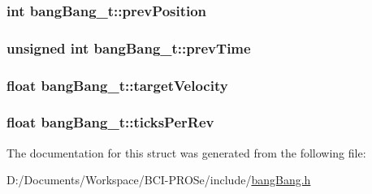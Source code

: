\subsubsection[{\texorpdfstring{prev\+Position}{prevPosition}}]{\setlength{\rightskip}{0pt plus 5cm}int bang\+Bang\+\_\+t\+::prev\+Position}\hypertarget{structbang_bang__t_a08cad64e2f790f4758c6f4318449176c}{}\label{structbang_bang__t_a08cad64e2f790f4758c6f4318449176c}
\subsubsection[{\texorpdfstring{prev\+Time}{prevTime}}]{\setlength{\rightskip}{0pt plus 5cm}unsigned int bang\+Bang\+\_\+t\+::prev\+Time}\hypertarget{structbang_bang__t_a9cb7011acdcf5b3c005effc1084d807c}{}\label{structbang_bang__t_a9cb7011acdcf5b3c005effc1084d807c}
\subsubsection[{\texorpdfstring{target\+Velocity}{targetVelocity}}]{\setlength{\rightskip}{0pt plus 5cm}float bang\+Bang\+\_\+t\+::target\+Velocity}\hypertarget{structbang_bang__t_a45c6612d984871c8051fe831a2a555d9}{}\label{structbang_bang__t_a45c6612d984871c8051fe831a2a555d9}
\subsubsection[{\texorpdfstring{ticks\+Per\+Rev}{ticksPerRev}}]{\setlength{\rightskip}{0pt plus 5cm}float bang\+Bang\+\_\+t\+::ticks\+Per\+Rev}\hypertarget{structbang_bang__t_aae2001616d202114e9557ea4b07158d9}{}\label{structbang_bang__t_aae2001616d202114e9557ea4b07158d9}


The documentation for this struct was generated from the following file\+:\begin{DoxyCompactItemize}
\item 
D\+:/\+Documents/\+Workspace/\+B\+C\+I-\/\+P\+R\+O\+Se/include/\hyperlink{bang_bang_8h}{bang\+Bang.\+h}\end{DoxyCompactItemize}
